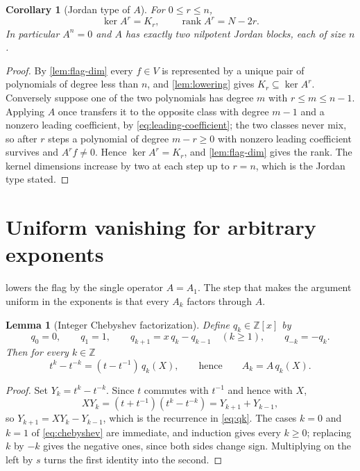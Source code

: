 \documentclass[11pt,reqno]{amsart}
\theoremstyle{plain}
\newtheorem{lemma}[theorem]{Lemma}
\newtheorem{corollary}[theorem]{Corollary}
\theoremstyle{definition}
\theoremstyle{remark}
\numberwithin{equation}{section}
\begin{document}
\begin{corollary}[Jordan type of $A$]
\label{cor:jordan}
For $0\le r\le n$,
\begin{equation}
  \ker A^{r}=K_{r},
  \qquad
  \operatorname{rank}A^{r}=N-2r.
  \label{eq:kernel-rank}
\end{equation}
In particular $A^{n}=0$ and $A$ has exactly two nilpotent Jordan blocks, each
of size $n$.
\end{corollary}

\begin{proof}
By \cref{lem:flag-dim} every $f\in V$ is represented by a unique pair of
polynomials of degree less than $n$, and \cref{lem:lowering} gives
$K_{r}\subseteq\ker A^{r}$. Conversely suppose one of the two polynomials has
degree $m$ with $r\le m\le n-1$. Applying $A$ once transfers it to the opposite
class with degree $m-1$ and a nonzero leading coefficient, by
\cref{eq:leading-coefficient}; the two classes never mix, so after $r$ steps a
polynomial of degree $m-r\ge0$ with nonzero leading coefficient survives and
$A^{r}f\ne0$. Hence $\ker A^{r}=K_{r}$, and \cref{lem:flag-dim} gives the rank.
The kernel dimensions increase by two at each step up to $r=n$, which is the
Jordan type stated.
\end{proof}

\section{Uniform vanishing for arbitrary exponents}
\label{sec:nilpotency}

 lowers the flag by the single operator $A=A_{1}$. The step
that makes the argument uniform in the exponents is that every $A_{k}$
factors through $A$.

\begin{lemma}[Integer Chebyshev factorization]
\label{lem:chebyshev}
Define $q_{k}\in\mathbb{Z}[x]$ by
\begin{equation}
  q_{0}=0,
  \qquad
  q_{1}=1,
  \qquad
  q_{k+1}=x\,q_{k}-q_{k-1}\quad(k\ge1),
  \qquad
  q_{-k}=-q_{k}.
  \label{eq:qk}
\end{equation}
Then for every $k\in\mathbb{Z}$
\begin{equation}
  t^{k}-t^{-k}=(t-t^{-1})\,q_{k}(X),
  \qquad\text{hence}\qquad
  A_{k}=A\,q_{k}(X).
  \label{eq:chebyshev}
\end{equation}
\end{lemma}

\begin{proof}
Set $Y_{k}=t^{k}-t^{-k}$. Since $t$ commutes with $t^{-1}$ and hence with $X$,
\begin{equation*}
  XY_{k}=(t+t^{-1})(t^{k}-t^{-k})=Y_{k+1}+Y_{k-1},
\end{equation*}
so $Y_{k+1}=XY_{k}-Y_{k-1}$, which is the recurrence in \cref{eq:qk}. The
cases $k=0$ and $k=1$ of \cref{eq:chebyshev} are immediate, and induction gives
every $k\ge0$; replacing $k$ by $-k$ gives the negative ones, since both sides
change sign. Multiplying on the left by $s$ turns the first identity into the
second.
\end{proof}
\end{document}
